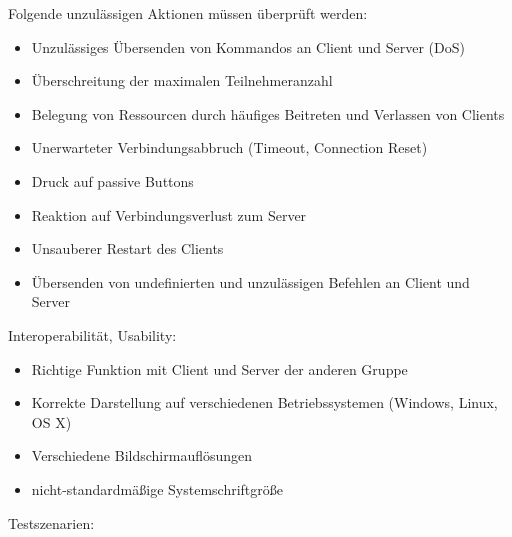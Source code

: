 \documentclass[a4paper,10pt]{article}
\begin{document}
Folgende unzulässigen Aktionen müssen überprüft werden:
\begin{itemize}
\item Unzulässiges Übersenden von Kommandos an Client und Server (DoS)
\item Überschreitung der maximalen Teilnehmeranzahl
\item Belegung von Ressourcen durch häufiges Beitreten und Verlassen von Clients
\item Unerwarteter Verbindungsabbruch (Timeout, Connection Reset)
\item Druck auf passive Buttons
\item Reaktion auf Verbindungsverlust zum Server
\item Unsauberer Restart des Clients
\item Übersenden von undefinierten und unzulässigen Befehlen an Client und Server
\end{itemize}
\newpage
Interoperabilität, Usability:
\begin{itemize}
\item Richtige Funktion mit Client und Server der anderen Gruppe
\item Korrekte Darstellung auf verschiedenen Betriebssystemen (Windows, Linux, OS X)
\item Verschiedene Bildschirmauflösungen
\item nicht-standardmäßige Systemschriftgröße
\end{itemize}
Testszenarien:
\end{document}
